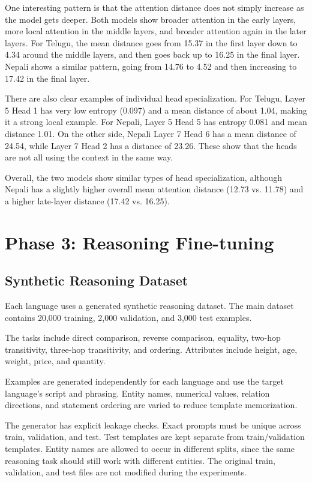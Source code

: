\documentclass[10pt,a4paper]{article}
\begin{document}
One interesting pattern is that the attention distance does not
simply increase as the model gets deeper. Both models show broader
attention in the early layers, more local attention in the middle
layers, and broader attention again in the later layers. For Telugu,
the mean distance goes from 15.37 in the first layer down to 4.34
around the middle layers, and then goes back up to 16.25 in the final
layer. Nepali shows a similar pattern, going from 14.76 to 4.52 and
then increasing to 17.42 in the final layer.

There are also clear examples of individual head specialization.
For Telugu, Layer 5 Head 1 has very low entropy (0.097) and a mean
distance of about 1.04, making it a strong local example. For Nepali,
Layer 5 Head 5 has entropy 0.081 and mean distance 1.01. On the
other side, Nepali Layer 7 Head 6 has a mean distance of 24.54, while
Layer 7 Head 2 has a distance of 23.26. These show that the heads are
not all using the context in the same way.

Overall, the two models show similar types of head specialization,
although Nepali has a slightly higher overall mean attention distance
(12.73 vs. 11.78) and a higher late-layer distance (17.42 vs. 16.25).

\section{Phase 3: Reasoning Fine-tuning}

\subsection{Synthetic Reasoning Dataset}

Each language uses a generated synthetic reasoning dataset.
The main dataset contains 20,000 training, 2,000 validation, and
3,000 test examples.

The tasks include direct comparison, reverse comparison, equality,
two-hop transitivity, three-hop transitivity, and ordering. Attributes
include height, age, weight, price, and quantity.

Examples are generated independently for each language and use the
target language's script and phrasing. Entity names, numerical
values, relation directions, and statement ordering are varied to
reduce template memorization.

The generator has explicit leakage checks. Exact prompts must be
unique across train, validation, and test. Test templates are kept
separate from train/validation templates. Entity names are allowed to
occur in different splits, since the same reasoning task should still
work with different entities. The original train, validation, and
test files are not modified during the experiments.
\end{document}
